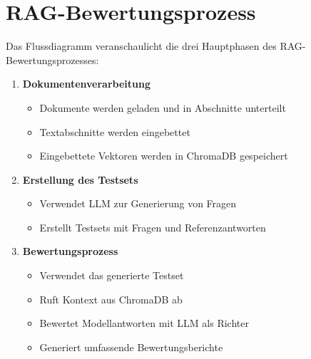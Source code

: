 \section{RAG-Bewertungsprozess}

Das Flussdiagramm veranschaulicht die drei Hauptphasen des RAG-Bewertungsprozesses:

\begin{enumerate}
    \item \textbf{Dokumentenverarbeitung}
    \begin{itemize}
        \item Dokumente werden geladen und in Abschnitte unterteilt
        \item Textabschnitte werden eingebettet
        \item Eingebettete Vektoren werden in ChromaDB gespeichert
    \end{itemize}
    
    \item \textbf{Erstellung des Testsets}
    \begin{itemize}
        \item Verwendet LLM zur Generierung von Fragen
        \item Erstellt Testsets mit Fragen und Referenzantworten
    \end{itemize}
    
    \item \textbf{Bewertungsprozess}
    \begin{itemize}
        \item Verwendet das generierte Testset
        \item Ruft Kontext aus ChromaDB ab
        \item Bewertet Modellantworten mit LLM als Richter
        \item Generiert umfassende Bewertungsberichte
    \end{itemize}
\end{enumerate}

